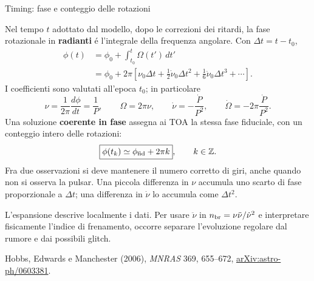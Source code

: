 \begin{frame}[t]{Timing: fase e conteggio delle rotazioni}
\vspace*{3mm}
\small\raggedright
Nel tempo $t$ adottato dal modello, dopo le correzioni dei ritardi,
la fase rotazionale in \textbf{radianti} \'e l'integrale della frequenza angolare.
Con $\Delta t=t-t_0$,
\begin{align*}
\phi(t)&=\phi_0+\int_{t_0}^{t}\Omega(t')\,dt'\\
&=\phi_0+2\pi\left[
\nu_0\Delta t+\frac12\dot\nu_0\Delta t^2
+\frac16\ddot\nu_0\Delta t^3+\cdots\right].
\end{align*}
I coefficienti sono valutati all'epoca $t_0$; in particolare
\[
\nu=\frac1{2\pi}\frac{d\phi}{dt}=\frac1P,
\qquad \Omega=2\pi\nu,
\qquad \dot\nu=-\frac{\dot P}{P^2},
\qquad \dot\Omega=-2\pi\frac{\dot P}{P^2}.
\]
Una soluzione \textbf{coerente in fase} assegna ai TOA la stessa fase fiduciale,
con un conteggio intero delle rotazioni:
\[
\boxed{\phi(t_k)\simeq\phi_{\rm fid}+2\pi k},
\qquad k\in\mathbb Z.
\]
Fra due osservazioni si deve mantenere il numero corretto di giri,
anche quando non si osserva la pulsar.
Una piccola differenza in $\nu$ accumula uno scarto di fase proporzionale
a $\Delta t$; una differenza in $\dot\nu$ lo accumula come $\Delta t^2$.
\par\smallskip
L'espansione descrive localmente i dati. Per usare $\ddot\nu$ in
$n_{\rm br}=\nu\ddot\nu/\dot\nu^2$ e interpretare fisicamente l'indice
di frenamento, occorre separare l'evoluzione regolare dal rumore e dai possibili glitch.
\par\smallskip
\footnotesize
Hobbs, Edwards e Manchester (2006), \emph{MNRAS} 369, 655--672,
\href{https://arxiv.org/abs/astro-ph/0603381}{arXiv:astro-ph/0603381}.
\end{frame}

